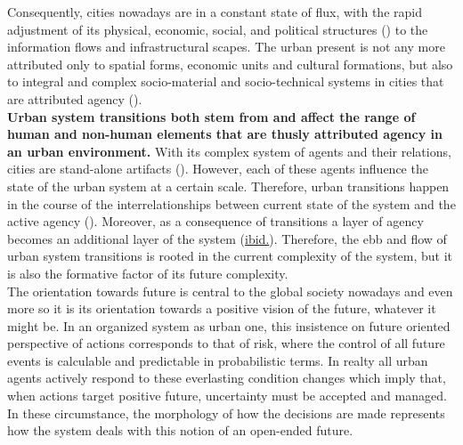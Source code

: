 \documentclass[11pt]{report}
\begin{document}
Consequently, cities nowadays are in a constant state of flux, with the rapid adjustment of its physical, economic, social, and political structures (\href{Sykola}{\citealt{sykora_transitional_1999}}) to the information flows and infrastructural scapes.
The urban present is not any more attributed only to spatial forms, economic units and cultural formations, but also to integral and complex socio-material and socio-technical systems in cities that are attributed agency (\href{Farias}{\citealt{farias_introduction:_2011}}). 
\\

\textbf{Urban system transitions both stem from and affect the range of human and non-human elements that are thusly attributed agency in an urban environment.}
With its complex system of agents and their relations, cities are stand-alone artifacts (\href{Portugali}{\cite{Portugali2011}}).
However, each of these agents influence the state of the urban system at a certain scale. 
Therefore, urban transitions happen in the course of the interrelationships between current state of the system and the active agency (\href{Guy}{\citealt{guy_understanding_2000}}).
Moreover, as a consequence of transitions a layer of agency becomes an additional layer of the system (\href{Guy}{ibid.}).
Therefore, the ebb and flow of urban system transitions is rooted in the current complexity of the system, but it is also the formative factor of its future complexity.
\\

The orientation towards future is central to the global society nowadays and even more so it is its orientation towards a positive vision of the future, whatever it might be.
In an organized system as urban one, this insistence on future oriented perspective of actions corresponds to that of risk, where the control of all future events is calculable and predictable in probabilistic terms.
In realty all urban agents actively respond to these everlasting condition changes which imply that, when actions target positive future, uncertainty must be accepted and managed.
In these circumstance, the morphology of how the decisions are made represents how the system deals with this notion of an open-ended future.   
\\
\end{document}
